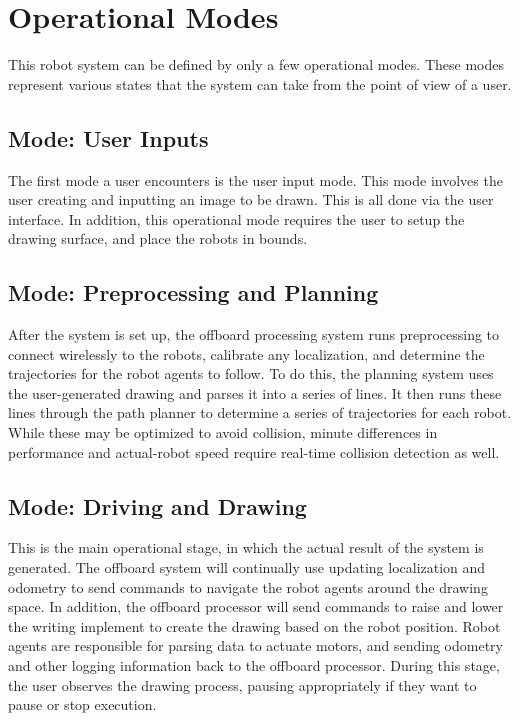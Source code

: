 
\section{Operational Modes}
\label{sec:operational_modes}
This robot system can be defined by only a few operational modes. These modes represent various states that the system can take from the point of view of a user.

\subsection{Mode: User Inputs}
\label{sec:operational_user}
The first mode a user encounters is the user input mode. This mode involves the user creating and inputting an image to be drawn. This is all done via the user interface. In addition, this operational mode requires the user to setup the drawing surface, and place the robots in bounds.

\subsection{Mode: Preprocessing and Planning}
\label{sec:operational_preprocess}
After the system is set up, the offboard processing system runs preprocessing to connect wirelessly to the robots, calibrate any localization, and determine the trajectories for the robot agents to follow. To do this, the planning system uses the user-generated drawing and parses it into a series of lines. It then runs these lines through the path planner to determine a series of trajectories for each robot. While these may be optimized to avoid collision, minute differences in performance and actual-robot speed require real-time collision detection as well.

\subsection{Mode: Driving and Drawing}
\label{sec:operational_driving}
This is the main operational stage, in which the actual result of the system is generated. The offboard system will continually use updating localization and odometry to send commands to navigate the robot agents around the drawing space. In addition, the offboard processor will send commands to raise and lower the writing implement to create the drawing based on the robot position. Robot agents are responsible for parsing data to actuate motors, and sending odometry and other logging information back to the offboard processor. During this stage, the user observes the drawing process, pausing appropriately if they want to pause or stop execution.

